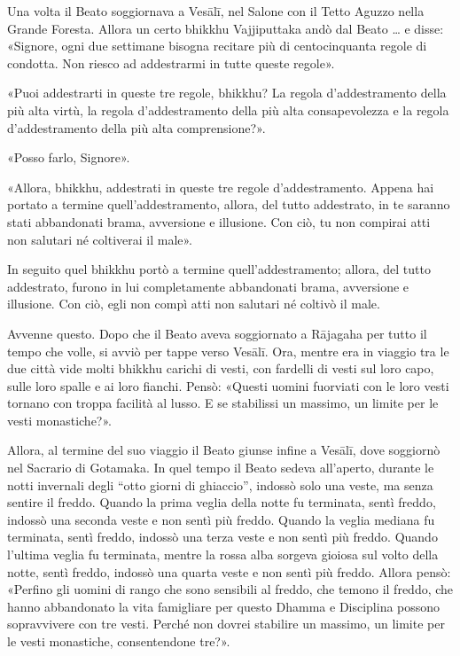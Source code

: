 

Una volta il Beato soggiornava a Vesālī, nel Salone con il Tetto Aguzzo
nella Grande Foresta. Allora un certo bhikkhu Vajjiputtaka andò dal
Beato … e disse: «Signore, ogni due settimane bisogna recitare più di
centocinquanta regole di condotta. Non riesco ad addestrarmi in tutte
queste regole».


«Puoi addestrarti in queste tre regole, bhikkhu? La regola
d’addestramento della più alta virtù, la regola d’addestramento della
più alta consapevolezza e la regola d’addestramento della più alta
comprensione?».


«Posso farlo, Signore».


«Allora, bhikkhu, addestrati in queste tre regole d’addestramento.
Appena hai portato a termine quell’addestramento, allora, del tutto
addestrato, in te saranno stati abbandonati brama, avversione e
illusione. Con ciò, tu non compirai atti non salutari né coltiverai il
male».


In seguito quel bhikkhu portò a termine quell’addestramento; allora, del
tutto addestrato, furono in lui completamente abbandonati brama,
avversione e illusione. Con ciò, egli non compì atti non salutari né
coltivò il male.




 Avvenne questo. Dopo che il Beato aveva soggiornato a
Rājagaha per tutto il tempo che volle, si avviò per tappe verso Vesālī.
Ora, mentre era in viaggio tra le due città vide molti bhikkhu carichi
di vesti, con fardelli di vesti sul loro capo, sulle loro spalle e ai
loro fianchi. Pensò: «Questi uomini fuorviati con le loro vesti tornano
con troppa facilità al lusso. E se stabilissi un massimo, un limite per
le vesti monastiche?».


Allora, al termine del suo viaggio il Beato giunse infine a Vesālī, dove
soggiornò nel Sacrario di Gotamaka. In quel tempo il Beato sedeva
all’aperto, durante le notti invernali degli “otto giorni di ghiaccio”,
indossò solo una veste, ma senza sentire il freddo. Quando la prima
veglia della notte fu terminata, sentì freddo, indossò una seconda veste
e non sentì più freddo. Quando la veglia mediana fu terminata, sentì
freddo, indossò una terza veste e non sentì più freddo. Quando l’ultima
veglia fu terminata, mentre la rossa alba sorgeva gioiosa sul volto
della notte, sentì freddo, indossò una quarta veste e non sentì più
freddo. Allora pensò: «Perfino gli uomini di rango che sono sensibili al
freddo, che temono il freddo, che hanno abbandonato la vita famigliare
per questo Dhamma e Disciplina possono sopravvivere con tre vesti.
Perché non dovrei stabilire un massimo, un limite per le vesti
monastiche, consentendone tre?».


